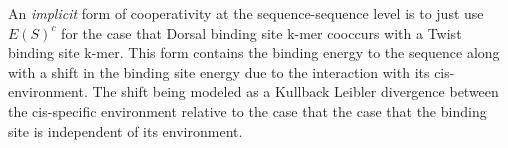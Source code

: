 An \textit{implicit} form of cooperativity at the sequence-sequence level is to just use $E(S)^c$ for the case that Dorsal binding site k-mer cooccurs with a Twist binding site k-mer.  This form contains the binding energy to the sequence along with a shift in the binding site energy due to the interaction with its cis-environment.  The shift being modeled as a Kullback Leibler divergence between the cis-specific environment relative to the case that the case that the binding site is independent of its environment.
